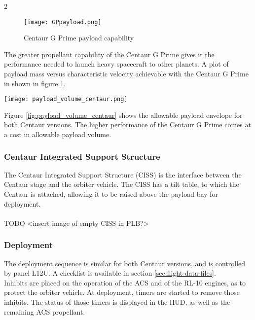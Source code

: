\documentclass[Space_Shuttle_Ultra_Manual.tex]{subfiles}
\begin{document}
\begin{multicols*}{2}
\begin{figure}[H]
	\centering
	\captionsetup{justification=centering}
  \texttt{[image: GPpayload.png]}
  \caption{Centaur G Prime payload capability}
  \label{fig:GPpayload}
\end{figure}
The greater propellant capability of the Centaur G Prime gives it the performance needed to launch heavy spacecraft to other planets. A plot of payload mass versus characteristic velocity achievable with the Centaur G Prime in shown in figure \ref{fig:GPpayload}.

\begin{figure*}[ht]
  \centering
  \texttt{[image: payload\_volume\_centaur.png]}
  \caption{Centaur G and G Prime Payload Envelope (dimensions in meters)}
  \label{fig:payload_volume_centaur}
\end{figure*}
Figure \ref{fig:payload_volume_centaur} shows the allowable payload envelope for both Centaur versions. The higher performance of the Centaur G Prime comes at a cost in allowable payload volume.

\subsubsection{Centaur Integrated Support Structure}
The Centaur Integrated Support Structure (CISS) is the interface between the Centaur stage and the orbiter vehicle. The CISS has a tilt table, to which the Centaur is attached, allowing it to be raised above the payload bay for deployment.
\\
\\
TODO <insert image of empty CISS in PLB?>

\subsubsection{Deployment}
The deployment sequence is similar for both Centaur versions, and is controlled by panel L12U. A checklist is available in section \ref{sec:flight-data-files}.
\\
Inhibits are placed on the operation of the ACS and of the RL-10 engines, as to protect the orbiter vehicle. At deployment, timers are started to remove those inhibits. The status of those timers is displayed in the HUD, as well as the remaining ACS propellant.


\end{multicols*}
\end{document}
